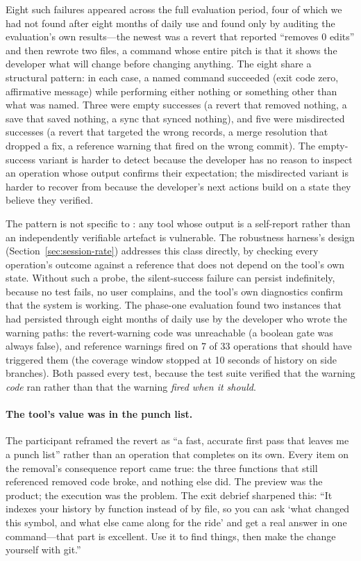 Eight such failures appeared across the full evaluation period,
four of which we had not found after eight months of daily use and
found only by auditing the evaluation's own results---the newest was a revert
that reported ``removes 0 edits'' and then rewrote two files, a command whose
entire pitch is that it shows the developer what will change before changing
anything. The eight share a structural pattern: in each case,
a named command succeeded (exit code zero, affirmative message) while performing
either nothing or something other than what was named. Three were empty
successes (a revert that removed nothing, a save that saved nothing, a sync that
synced nothing), and five were misdirected successes (a revert that targeted the
wrong records, a merge resolution that dropped a fix, a reference warning that
fired on the wrong commit). The empty-success variant is harder to detect because
the developer has no reason to inspect an operation whose output confirms their
expectation; the misdirected variant is harder to recover from because the
developer's next actions build on a state they believe they verified.

The pattern is not specific to \sgt{}: any tool whose output is a self-report
rather than an independently verifiable artefact is vulnerable. The robustness
harness's design (Section~\ref{sec:session-rate}) addresses this class directly,
by checking every operation's outcome against a reference that does not depend on
the tool's own state. Without such a probe, the silent-success failure can persist
indefinitely, because no test fails, no user complains, and the tool's own
diagnostics confirm that the system is working. The phase-one evaluation found two
instances that had persisted through eight months of daily use by the developer
who wrote the warning paths: the revert-warning code was unreachable (a boolean
gate was always false), and reference warnings fired on 7 of 33 operations that
should have triggered them (the coverage window stopped at 10 seconds of history
on side branches). Both passed every test, because the test suite verified that
the warning \emph{code} ran rather than that the warning \emph{fired when it
should}.

\paragraph{The tool's value was in the punch list.}
The participant reframed the revert as ``a fast, accurate first pass that
leaves me a punch list'' rather than an operation that completes on its own.
Every item on the removal's consequence report came true: the three functions
that still referenced removed code broke, and nothing else did. The preview was
the product; the execution was the problem. The exit debrief sharpened this:
``It indexes your history by function instead of by file, so you can ask `what
changed this symbol, and what else came along for the ride' and get a real
answer in one command---that part is excellent. Use it to find things, then make
the change yourself with git.''

